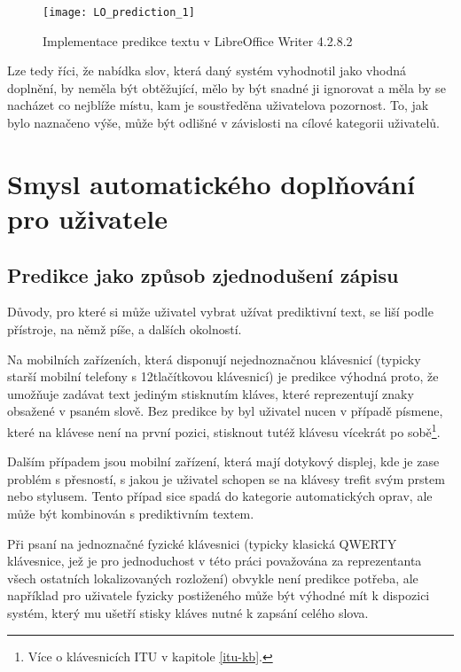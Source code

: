 \documentclass[a4paper,11pt]{article}
\begin{document}
\begin{figure}[h]
	\centering
	\texttt{[image: LO\_prediction\_1]}
	\caption{Implementace predikce textu v LibreOffice Writer 4.2.8.2}
	\label{fig:LOpredict}
\end{figure}

Lze tedy říci, že nabídka slov, která daný systém vyhodnotil jako vhodná doplnění, by neměla být obtěžující, mělo by být snadné ji ignorovat a měla by se nacházet co nejblíže místu, kam je soustředěna uživatelova pozornost. To, jak bylo naznačeno výše, může být odlišné v závislosti na cílové kategorii uživatelů.

\section{Smysl automatického doplňování pro uživatele}

\subsection{Predikce jako způsob zjednodušení zápisu}

Důvody, pro které si může uživatel vybrat užívat prediktivní text, se liší podle přístroje, na němž píše, a dalších okolností.

Na mobilních zařízeních, která disponují nejednoznačnou klávesnicí (typicky starší mobilní telefony s 12tlačítkovou klávesnicí) je predikce výhodná proto, že umožňuje zadávat text jediným stisknutím kláves, které reprezentují znaky obsažené v psaném slově. Bez predikce by byl uživatel nucen v případě písmene, které na klávese není na první pozici, stisknout tutéž klávesu vícekrát po sobě\footnote{Více o klávesnicích ITU v kapitole \ref{itu-kb}.}.

Dalším případem jsou mobilní zařízení, která mají dotykový displej, kde je zase problém s přesností, s jakou je uživatel schopen se na klávesy trefit svým prstem nebo stylusem. Tento případ sice spadá do kategorie automatických oprav, ale může být kombinován s prediktivním textem. %

Při psaní na jednoznačné fyzické klávesnici (typicky klasická QWERTY klávesnice, jež je pro jednoduchost v této práci považována za reprezentanta všech ostatních lokalizovaných rozložení) obvykle není predikce potřeba, ale například pro uživatele fyzicky postiženého může být výhodné mít k dispozici systém, který mu ušetří stisky kláves nutné k zapsání celého slova.
\end{document}
